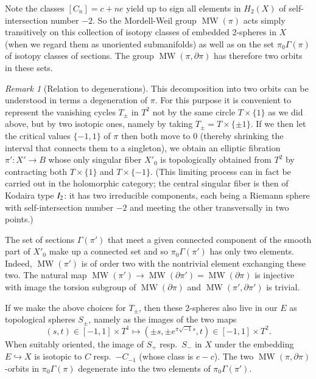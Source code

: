 \documentclass[10pt,letterpaper]{amsart}
\numberwithin{equation}{section}
\def\G{\Gamma}
\def\Itwo{{\rm I_2}}
\newcommand{\p}{\partial}
\newcommand\MW{\operatorname{MW}}
\theoremstyle{remark}
\newtheorem{remark}[theorem]{Remark}
\begin{document}
Note the classes  $[C_n]=c+ne$ yield up to sign all elements in $H_2(X)$ of self-intersection number $-2$.
So the Mordell-Weil group $\MW(\pi)$ acts simply transitively  on this collection of isotopy classes of embedded
$2$-spheres in $X$ (when we regard them as unoriented submanifolds) as well as on the set  $\pi_0\G(\pi)$ of 
isotopy classes of sections. The group $\MW(\pi, \p \pi)$ has therefore two orbits in these sets. 

\begin{remark}[Relation to degenerations]
\label{rem:I2observation}
This decomposition into two orbits can be understood in terms a degeneration of $\pi$. For this purpose  it is convenient  to  represent the vanishing cycles $T_\pm$ in $T^2$ not by the same circle $T\times\{1\}$ as we did above, 
but by two isotopic ones, namely by taking  $T_\pm=T\times\{\pm 1\}$.  If we  then let the critical values 
$\{-1,1\}$ of $\pi$ then both move to $0$ (thereby shrinking the interval that connects them to a singleton), we   
obtain an elliptic fibration $\pi' : X'\to B$ whose only singular fiber  $X'_0$  is  topologically obtained from $T^2$ by contracting both $T\times \{1\}$ and  $T\times \{-1\}$. (This limiting process can  in fact be carried out in the holomorphic category;  the  central singular  fiber is then of Kodaira type $\Itwo$: it has two irreducible components,  each being a Riemann sphere with self-intersection number $-2$ 
and meeting the other transversally in two points.) 

The set of sections $\G (\pi')$ that meet a given connected component of the smooth part of $X'_0$ make up a connected set and so  $\pi_0\G (\pi')$ 
has only two elements. Indeed, $\MW(\pi')$ is of order two with the nontrivial element exchanging  these two.
The natural map $\MW(\pi')\to \MW(\p\pi')=\MW(\p \pi)$ is injective with image the torsion subgroup of $\MW(\p \pi)$ and $\MW(\pi', \p\pi')$ is trivial.

If we make  the above choices for $T_\pm$, then these 2-spheres also live in our $E$ 
as topological spheres  $S_\pm$, namely as the images of the two maps 
\[
(s,t)\in [-1,1]\times T^1\mapsto (\pm s, \pm e^{\pi\sqrt{-1}s}, t)\in [-1,1]\times T^2.
\]
When suitably oriented, the image of $S_+$ resp.\ $S_-$  in $X$ under the embedding $E\hookrightarrow X$ is 
isotopic  to $C$ resp.\ $-C_{-1}$ (whose class is $e-c$). The two $\MW(\pi, \p \pi)$-orbits in $\pi_0\G(\pi)$ 
degenerate into the two elements of  $\pi_0\G(\pi')$.
\end{remark}
\end{document}
